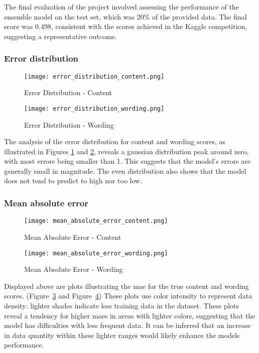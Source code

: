 The final evaluation of the project involved assessing the performance of the ensemble model on the test set, which was 20\% of the provided data. The final score was 0.498, consistent with the scores achieved in the Kaggle competition, suggesting a representative outcome.

\subsubsection*{Error distribution}
\begin{figure}[H]
    \texttt{[image: error\_distribution\_content.png]}
    \caption{Error Distribution - Content}
    \label{fig:error_distribution_content}
\end{figure}
\begin{figure}[H]
    \texttt{[image: error\_distribution\_wording.png]}
    \caption{Error Distribution - Wording}
    \label{fig:error_distribution_wording}
\end{figure}
The analysis of the error distribution for content and wording scores, as illustrated in Figures \ref{fig:error_distribution_content} and \ref{fig:error_distribution_wording}, 
reveals a gaussian distribution peak around zero, with most errors being smaller than 1. This suggests that the model's errors are generally small in magnitude. The even distribution also shows that the model does not tend to predict to high nor too low.

\subsubsection*{Mean absolute error}

\begin{figure}[H]
    \texttt{[image: mean\_absolute\_error\_content.png]}
    \caption{Mean Absolute Error - Content}
    \label{fig:mean_absolute_error_content}
\end{figure}
\begin{figure}[H]
    \texttt{[image: mean\_absolute\_error\_wording.png]}
    \caption{Mean Absolute Error - Wording}
    \label{fig:mean_absolute_error_wording}
\end{figure}
Displayed above are plots illustrating the \gls{mae} for the true content and wording scores. (Figure~\ref{fig:mean_absolute_error_content} and Figure~\ref{fig:mean_absolute_error_wording}) These plots use color intensity to represent data density: lighter shades indicate less training data in the dataset.
These plots reveal a tendency for higher \glspl{mae} in areas with lighter colors, suggesting that the model has difficulties with less frequent data. It can be inferred that an increase in data quantity within these lighter ranges would likely enhance the models performance.